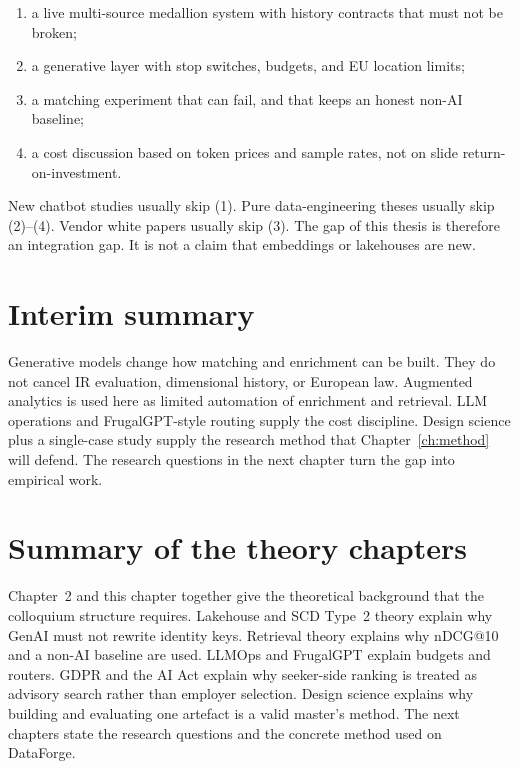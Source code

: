 \begin{enumerate}
  \item a live multi-source medallion system with history contracts that must not be broken;
  \item a generative layer with stop switches, budgets, and EU location limits;
  \item a matching experiment that can fail, and that keeps an honest non-AI baseline;
  \item a cost discussion based on token prices and sample rates, not on slide return-on-investment.
\end{enumerate}

New chatbot studies usually skip (1). Pure data-engineering theses usually skip (2)--(4). Vendor white papers usually skip (3). The gap of this thesis is therefore an integration gap. It is not a claim that embeddings or lakehouses are new.

\section{Interim summary}
\label{sec:interim2}

Generative models change how matching and enrichment can be built. They do not cancel IR evaluation, dimensional history, or European law. Augmented analytics is used here as limited automation of enrichment and retrieval. LLM operations and FrugalGPT-style routing supply the cost discipline. Design science plus a single-case study supply the research method that Chapter~\ref{ch:method} will defend. The research questions in the next chapter turn the gap into empirical work.

\section{Summary of the theory chapters}
\label{sec:theory-summary}

Chapter~2 and this chapter together give the theoretical background that the colloquium structure requires. Lakehouse and SCD Type~2 theory explain why GenAI must not rewrite identity keys. Retrieval theory explains why nDCG@10 and a non-AI baseline are used. LLMOps and FrugalGPT explain budgets and routers. GDPR and the AI Act explain why seeker-side ranking is treated as advisory search rather than employer selection. Design science explains why building and evaluating one artefact is a valid master's method. The next chapters state the research questions and the concrete method used on DataForge.
